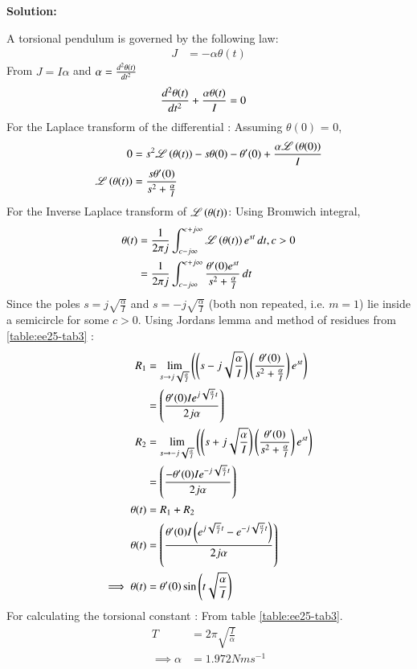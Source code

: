 \documentclass[journal,12pt,onecolumn]{IEEEtran}
\theoremstyle{remark}
\begin{document}
\textbf{Solution:}
    
A torsional pendulum is governed by the following law:
\begin{align}
    J &= -\alpha\theta(t) 
\end{align}
From $J = I\alpha$ and $\alpha = \dv[2]{\theta(t)}{t}$
\begin{align}
\dv[2]{\theta(t)}{t} + \frac{\alpha\theta(t)}{I} &= 0
\end{align}
For the Laplace transform of the differential : 
Assuming $\theta(0)$ = 0,
\begin{align}
0 &= s^2\mathscr{L}\left(\theta(t)\right) - s\theta(0) - \theta'(0) + \frac{\alpha\mathscr{L}\left(\theta(0)\right)}{I}\\
\mathscr{L}\left(\theta(t)\right) &= \frac{s\theta'(0)}{s^2+\frac{\alpha}{I}}
    \end{align}
For the Inverse Laplace transform of $\mathscr{L}\left(\theta(t)\right)$: Using Bromwich integral,
\begin{align}
 \theta(t) &= \frac{1}{2\pi j}\int_{c-j\infty}^{c+j\infty}\mathscr{L}\left(\theta(t)\right)e^{st}\,dt , c > 0\\
 &= \frac{1}{2\pi j}\int_{c-j\infty}^{c+j\infty}\frac{\theta'(0)e^{st}}{s^2+\frac{\alpha}{I}}\,dt
\end{align}
Since the poles $s=j\sqrt{\frac{\alpha}{I}}$ and $s=-j\sqrt{\frac{\alpha}{I}}$ (both non repeated, i.e. $m=1$) lie inside a semicircle for some $c>0$. Using Jordans lemma and method of residues from \ref{table:ee25-tab3} :
\begin{align}
      R_1&=\lim\limits_{s\to j\sqrt{\frac{\alpha}{I}}}\left({\left(s-j\sqrt{\frac{\alpha}{I}}\right)}\left(\frac{\theta'(0)}{s^2+\frac{\alpha}{I}}\right) e^{st}\right)\\
&={\left(\frac{\theta'(0)Ie^{j\sqrt{\frac{\alpha}{I}}t}}{2j\alpha}\right)}\\
  R_2&=\lim\limits_{s\to -j\sqrt{\frac{\alpha}{I}}}\left({\left(s+j\sqrt{\frac{\alpha}{I}}\right)}\left(\frac{\theta'(0)}{s^2+\frac{\alpha}{I}}\right) e^{st}\right)\\
&={\left(\frac{-\theta'(0)Ie^{-j\sqrt{\frac{\alpha}{I}}t}}{2j\alpha}\right)}\\
\theta(t) &= R_1 + R_2\\
\theta(t) &= {\left(\frac{\theta'(0)I\left(e^{j\sqrt{\frac{\alpha}{I}}t}-e^{-j\sqrt{\frac{\alpha}{I}}t}\right)}{2j\alpha}\right)}\\
\implies
\theta(t) &=\theta'(0)\sin{\ensuremath{\left(t\sqrt{\frac{\alpha}{I}}\right)}}
\end{align}
For calculating the torsional constant :
From table \ref{table:ee25-tab3}.
\begin{align}
 T &= 2\pi\sqrt{\frac{I}{\alpha}}\\
\implies \alpha &= 1.972 Nms^{-1}
\end{align}
\end{document}
